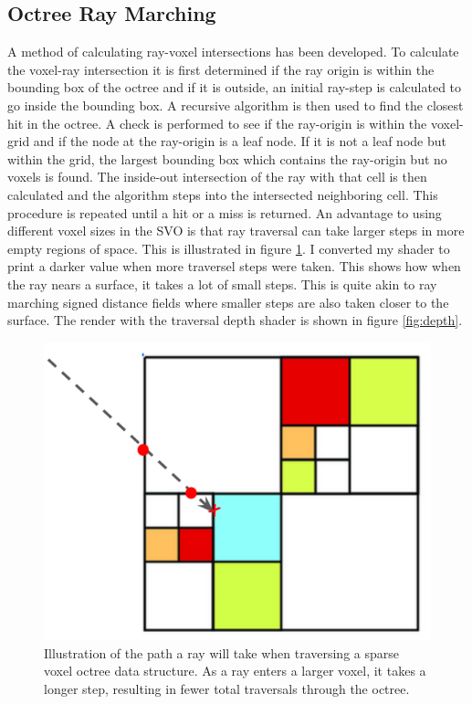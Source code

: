 \subsection*{Octree Ray Marching}
A method of calculating ray-voxel intersections has been developed. To calculate the voxel-ray intersection it is first determined if the ray origin is within the bounding box of the octree and if it is outside, an initial ray-step is calculated to go inside the bounding box. A recursive algorithm is then used to find the closest hit in the octree. A check is performed to see if the ray-origin is within the voxel-grid and if the node at the ray-origin is a leaf node. If it is not a leaf node but within the grid, the largest bounding box which contains the ray-origin but no voxels is found. The inside-out intersection of the ray with that cell is then calculated and the algorithm steps into the intersected neighboring cell. This procedure is repeated until a hit or a miss is returned. An advantage to using different voxel sizes in the SVO is that ray traversal can take larger steps in more empty regions of space. This is illustrated in figure \ref{fig:trace}. I converted my shader to print a darker value when more traversel steps were taken. This shows how when the ray nears a surface, it takes a lot of small steps. This is quite akin to ray marching signed distance fields where smaller steps are also taken closer to the surface. The render with the traversal depth shader is shown in figure \ref{fig:depth}.
\begin{figure}
	\centering
	\includegraphics[width=.8\linewidth]{trace}
	\caption{Illustration of the path a ray will take when traversing a sparse voxel octree data structure. As a ray enters a larger voxel, it takes a longer step, resulting in fewer total traversals through the octree.}
	\label{fig:trace}
\end{figure}

